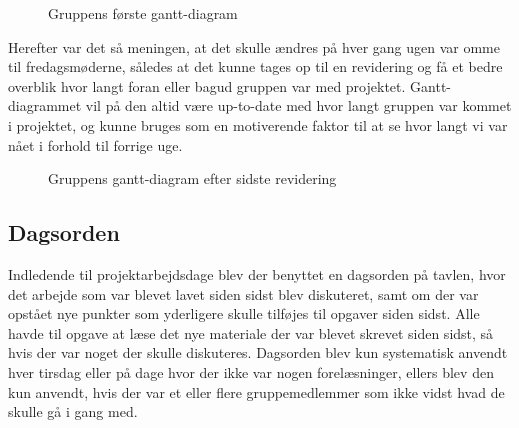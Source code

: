 \begin{figure}[H]
    \centering
    \caption{Gruppens første gantt-diagram}
    \label{Gantt-diagram-first}
\end{figure}

Herefter var det så meningen, at det skulle ændres på hver gang ugen var omme til fredagsmøderne, således at det kunne tages op til en revidering og få et bedre overblik hvor langt foran eller bagud gruppen var med projektet. Gantt-diagrammet vil på den altid være up-to-date med hvor langt gruppen var kommet i projektet, og kunne bruges som en motiverende faktor til at se hvor langt vi var nået i forhold til forrige uge.

\begin{figure}[H]
    \centering
    \caption{Gruppens gantt-diagram efter sidste revidering}
    \label{Gantt-diagram-picture}
\end{figure}

\subsection*{Dagsorden}\label{Dagsorden}
Indledende til projektarbejdsdage blev der benyttet en dagsorden på tavlen, hvor det arbejde som var blevet lavet siden sidst blev diskuteret, samt om der var opstået nye punkter som yderligere skulle tilføjes til opgaver siden sidst. Alle havde til opgave at læse det nye materiale der var blevet skrevet siden sidst, så hvis der var noget der skulle diskuteres. Dagsorden blev kun systematisk anvendt hver tirsdag eller på dage hvor der ikke var nogen forelæsninger, ellers blev den kun anvendt, hvis der var et eller flere gruppemedlemmer som ikke vidst hvad de skulle gå i gang med. 

